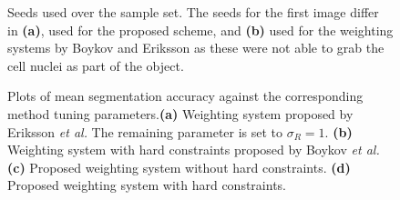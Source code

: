 \begin{figure}[!h]
	\centering
	
	\caption{Seeds used over the sample set. The seeds for the first image differ in \textbf{(a)}, used for the proposed scheme, and \textbf{(b)} used for the weighting systems by Boykov and Eriksson as these were not able to grab the cell nuclei as part of the object.}
	\label{fig:samplesetseed}
\end{figure}

\begin{figure}[!t]
	\centering


	\caption{Plots of mean segmentation accuracy against the corresponding method tuning parameters.\textbf{(a)} Weighting system proposed by Eriksson \textit{et al.} The remaining parameter is set to $\sigma_R=1$. \textbf{(b)} Weighting system with hard constraints proposed by Boykov \textit{et al.} \textbf{(c)} Proposed weighting system without hard constraints. \textbf{(d)} Proposed weighting system with hard constraints.}
	\label{fig:interactiveweightingcomparison}
\end{figure}

